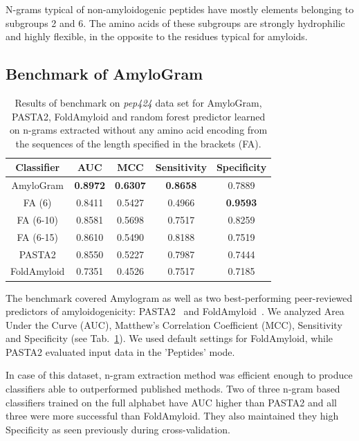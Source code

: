 \documentclass[a4,center,fleqn]{NAR}
\begin{document}
  N-grams typical of non-amyloidogenic peptides have mostly elements 
belonging to subgroups 2 and 6. The amino acids of these subgroups are strongly 
hydrophilic and highly flexible, in the opposite to the residues typical for 
amyloids.

\subsection{Benchmark of AmyloGram}

\begin{table}[ht]
\centering
\caption{Results of benchmark on \textit{pep424} data set for AmyloGram, 
PASTA2, FoldAmyloid and random forest predictor learned on n-grams extracted 
without any amino acid encoding from the sequences of the length specified in 
the brackets (FA).} 
\label{tab:bench_summary}
\begin{tabular}{ccccc}
  \toprule
Classifier & AUC & MCC & Sensitivity & Specificity \\ 
  \midrule
AmyloGram & \textbf{0.8972} & \textbf{0.6307} & \textbf{0.8658} & 0.7889 \\ 
   \rowcolor[gray]{0.85}FA (6) & 0.8411 & 0.5427 & 0.4966 & 
\textbf{0.9593} \\ 
  FA (6-10) & 0.8581 & 0.5698 & 0.7517 & 0.8259 \\ 
   \rowcolor[gray]{0.85}FA (6-15) & 0.8610 & 0.5490 & 0.8188 & 
0.7519 \\ 
\hline \hline
   PASTA2 & 0.8550 & 0.5227 & 0.7987 & 0.7444 \\ 
  \rowcolor[gray]{0.85}FoldAmyloid & 0.7351 & 0.4526 & 0.7517 & 0.7185 \\ 

   \bottomrule
\end{tabular}
\end{table}

The benchmark covered Amylogram as well as two best-performing peer-reviewed 
predictors of amyloidogenicity: PASTA2~\citep{walsh_pasta_2014} and 
FoldAmyloid~\citep{garbuzynskiy_foldamyloid:_2010}. We analyzed Area Under the 
Curve (AUC), Matthew's Correlation Coefficient (MCC), Sensitivity and 
Specificity (see Tab.~\ref{tab:bench_summary}). We used default settings for 
FoldAmyloid, while PASTA2 evaluated input data in the 'Peptides' mode.
    
  In case of this dataset, n-gram extraction method was efficient enough to 
produce classifiers able to outperformed published methods. Two of three n-gram 
based classifiers trained on the full alphabet have AUC higher than PASTA2 and 
all three were more successful than FoldAmyloid. They also maintained they high 
Specificity as seen previously during cross-validation.
    
\end{document}
